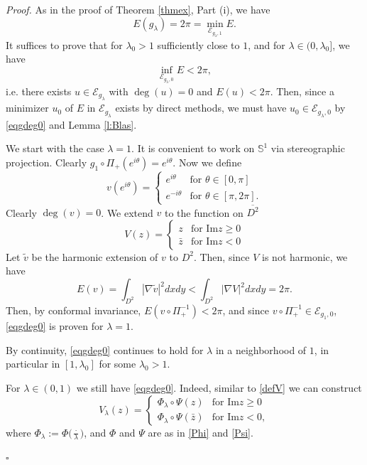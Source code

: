\documentclass[12pt, a4paper]{article}
\newenvironment{proof}{\noindent\emph{Proof.}}{\hfill$\square$\medskip}
\newcommand{\M}[1]{\mathcal{#1}}
\newcommand{\sph}{\mathbb{S}}
\newcommand{\cl}[1]{\overline{#1}}
\renewcommand{\(}{\left(}
\renewcommand{\)}{\right)}
\begin{document}
\begin{proof} As in the proof of Theorem \ref{thmex}, Part (i), we have
$$E(g_\lambda)=2\pi =\min_{\M{E}_{g_\lambda,1}}E.$$
It suffices to prove that for $\lambda_0>1$ sufficiently close to $1$, and for $\lambda\in (0,\lambda_0]$, we have
\begin{equation}\label{eqgdeg0}
\inf_{\M{E}_{g_\lambda,0}} E<2\pi,
\end{equation}
i.e. there exists $u\in \M{E}_{g_\lambda}$ with $\deg(u)=0$ and $E(u)<2\pi$. Then, since a minimizer $u_0$ of $E$ in $\M{E}_{g_\lambda}$ exists by direct methods, we must have $u_0\in \M{E}_{g_\lambda,0}$ by \eqref{eqgdeg0} and Lemma \ref{l:Blas}.

We start with the case $\lambda=1$. It is convenient to work on $\sph^1$ via stereographic projection. Clearly $g_1\circ \Pi_+(e^{i\theta})=e^{i\theta}$. Now we define
\[
v(e^{i\theta})=
\begin{cases}
e^{i\theta} &\text{for }\theta\in [0,\pi]\\
e^{-i\theta} & \text{for }\theta\in [\pi,2\pi].
\end{cases}
\]
Clearly $\deg(v)=0$. We extend $v$ to the function on $\cl{D^2}$
\begin{equation}\label{defV}
V(z)=
\begin{cases}
z &\text{for }\mathrm{Im}z\ge 0\\
\bar z & \text{for }\mathrm{Im}z< 0
\end{cases}
\end{equation}
Let $\tilde v$ be the harmonic extension of $v$ to $D^2$. Then, since $V$ is not harmonic, we have
$$E(v)=\int_{D^2}|\nabla \tilde v|^2dxdy<\int_{D^2}|\nabla V|^2dxdy=2\pi.$$
Then, by conformal invariance, $E(v\circ\Pi_+^{-1})<2\pi$, and since $v\circ\Pi_+^{-1}\in \M{E}_{g_1,0}$, \eqref{eqgdeg0} is proven for $\lambda=1$.

By continuity, \eqref{eqgdeg0} continues to hold for $\lambda$ in a neighborhood of $1$, in particular in $[1,\lambda_0]$ for some $\lambda_0>1$.

For $\lambda \in (0,1)$ we still have \eqref{eqgdeg0}. Indeed, similar to \eqref{defV} we can construct
\begin{equation*} 
V_\lambda(z)=
\begin{cases}
\Phi_\lambda\circ \Psi (z) &\text{for }\mathrm{Im}z\ge 0\\
\Phi_\lambda\circ \Psi (\bar z) & \text{for }\mathrm{Im}z< 0,
\end{cases}
\end{equation*}
where $\Phi_\lambda:= \Phi\big(\frac{\cdot}{\lambda}\big)$, and $\Phi$ and $\Psi$ are as in \eqref{Phi} and \eqref{Psi}.


\end{proof}
\end{document}
